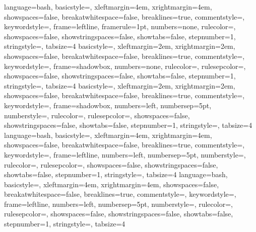 \usepackage{listings}	
\usepackage[usenames,dvipsnames,svgnames]{xcolor} %
\lstset{
    basicstyle=\ttfamily,	%
}
 {
    language=bash,
    basicstyle=\scriptsize\ttfamily,
    xleftmargin=4em,
    xrightmargin=4em,
    showspaces=false,
    breakatwhitespace=false,
    breaklines=true,
    commentstyle=\color[rgb]{0,0.6,0},
    keywordstyle=\color{blue},
    frame=leftline,
    framerule=1pt,
    numbers=none,
    rulecolor=\color{blue},
    showspaces=false,
    showstringspaces=false,
    showtabs=false,
    stepnumber=1,
    stringstyle=\color[rgb]{0.58,0,0.82},
    tabsize=4
}
 {
    basicstyle=\small\ttfamily,
    xleftmargin=2em,
    xrightmargin=2em,
    showspaces=false,
    breakatwhitespace=false,
    breaklines=true,
    commentstyle=\color[rgb]{0,0.6,0},
    keywordstyle=\color{blue},
    frame=shadowbox,
    numbers=none,
    rulecolor=\color{black},
    rulesepcolor=\color{blue},
    showspaces=false,
    showstringspaces=false,
    showtabs=false,
    stepnumber=1,
    stringstyle=\color[rgb]{0.58,0,0.82},
    tabsize=4
}
 {
    basicstyle=\small\ttfamily,
    xleftmargin=2em,
    xrightmargin=2em,
    showspaces=false,
    breakatwhitespace=false,
    breaklines=true,
    commentstyle=\color[rgb]{0,0.6,0},
    keywordstyle=\color{blue},
    frame=shadowbox,
    numbers=left,
    numbersep=5pt,
    numberstyle=\small\color[rgb]{0.5,0.5,0.5},
    rulecolor=\color{black},
    rulesepcolor=\color{blue},
    showspaces=false,
    showstringspaces=false,
    showtabs=false,
    stepnumber=1,
    stringstyle=\color[rgb]{0.58,0,0.82},
    tabsize=4
}
 {
    language=bash,
    basicstyle=\scriptsize\ttfamily,
    xleftmargin=4em,
    xrightmargin=4em,
    showspaces=false,
    breakatwhitespace=false,
    breaklines=true,
    commentstyle=\color[rgb]{0,0.6,0},
    keywordstyle=\color{blue},
    frame=leftline,
    numbers=left,
    numbersep=5pt,
    numberstyle=\small\color[rgb]{0.5,0.5,0.5},
    rulecolor=\color{black},
    rulesepcolor=\color{blue},
    showspaces=false,
    showstringspaces=false,
    showtabs=false,
    stepnumber=1,
    stringstyle=\color[rgb]{0.58,0,0.82},
    tabsize=4
}
 {
    language=bash,
    basicstyle=\scriptsize\ttfamily,
    xleftmargin=4em,
    xrightmargin=4em,
    showspaces=false,
    breakatwhitespace=false,
    breaklines=true,
    commentstyle=\color[rgb]{0,0.6,0},
    keywordstyle=\color{blue},
    frame=leftline,
    numbers=left,
    numbersep=5pt,
    numberstyle=\small\color[rgb]{0.5,0.5,0.5},
    rulecolor=\color{black},
    rulesepcolor=\color{blue},
    showspaces=false,
    showstringspaces=false,
    showtabs=false,
    stepnumber=1,
    stringstyle=\color[rgb]{0.58,0,0.82},
    tabsize=4
}
